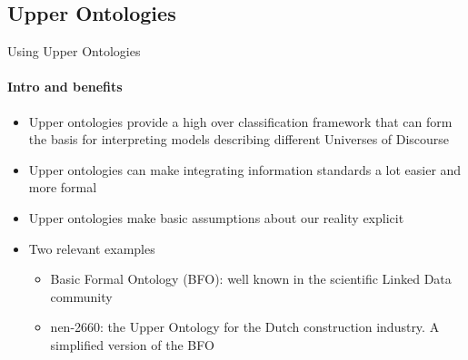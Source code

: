 \subsection{Upper Ontologies}
\begin{frame}{Using Upper Ontologies}
    \framesubtitle{Intro and benefits}


    \begin{itemize}
        \item Upper ontologies provide a high over classification framework that can form the basis for interpreting models describing different Universes of Discourse
        \item Upper ontologies can make integrating information standards a lot easier and more formal
        \item Upper ontologies make basic assumptions about our reality explicit
        \item Two relevant examples
        \begin{itemize}
            \item Basic Formal Ontology (BFO): well known in the scientific Linked Data community
            \item nen-2660: the Upper Ontology for the Dutch construction industry. A simplified version of the BFO
        \end{itemize}
    \end{itemize}
\end{frame}
